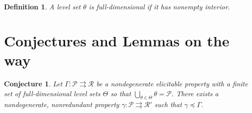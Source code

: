 \documentclass[12pt]{article}
\renewcommand{\P}{\mathcal{P}}
\newcommand{\R}{\mathcal{R}}
\newcommand{\toto}{\rightrightarrows}
\newtheorem{definition}{Definition}
\newtheorem{conjecture}{Conjecture}
\begin{document}
\begin{definition}
	A level set $\theta$ is \emph{full-dimensional} if it has nonempty interior.
\end{definition}



\section{Conjectures and Lemmas on the way}

\begin{conjecture}\label{conj:gam-prime-exists}
	Let $\Gamma:\P \toto \R$ be a nondegenerate elicitable property with a finite set of full-dimensional level sets $\Theta$ so that $\bigcup_{\theta \in \Theta}\theta = \P$.
	There exists a nondegenerate, nonredundant property $\gamma: \P \toto \R'$ such that $\gamma \preceq \Gamma$. 
\end{conjecture}
\end{document}
